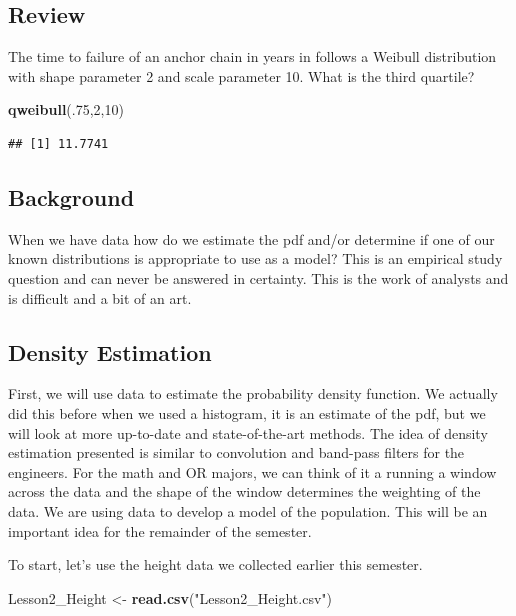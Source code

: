\documentclass[]{book}
\newenvironment{Shaded}{\begin{snugshade}}{\end{snugshade}}
\newcommand{\KeywordTok}[1]{\textcolor[rgb]{0.13,0.29,0.53}{\textbf{#1}}}
\newcommand{\DecValTok}[1]{\textcolor[rgb]{0.00,0.00,0.81}{#1}}
\newcommand{\StringTok}[1]{\textcolor[rgb]{0.31,0.60,0.02}{#1}}
\newcommand{\NormalTok}[1]{#1}
\theoremstyle{definition}
\theoremstyle{definition}
\theoremstyle{definition}
\theoremstyle{remark}
\begin{document}
\subsection{Review}\label{review-3}

The time to failure of an anchor chain in years in follows a Weibull
distribution with shape parameter 2 and scale parameter 10. What is the
third quartile?

\begin{Shaded}
\begin{Highlighting}[]
\KeywordTok{qweibull}\NormalTok{(.}\DecValTok{75}\NormalTok{,}\DecValTok{2}\NormalTok{,}\DecValTok{10}\NormalTok{)}
\end{Highlighting}
\end{Shaded}

\begin{verbatim}
## [1] 11.7741
\end{verbatim}

\subsection{Background}\label{background-1}

When we have data how do we estimate the pdf and/or determine if one of
our known distributions is appropriate to use as a model? This is an
empirical study question and can never be answered in certainty. This is
the work of analysts and is difficult and a bit of an art.

\subsection{Density Estimation}\label{density-estimation}

First, we will use data to estimate the probability density function. We
actually did this before when we used a histogram, it is an estimate of
the pdf, but we will look at more up-to-date and state-of-the-art
methods. The idea of density estimation presented is similar to
convolution and band-pass filters for the engineers. For the math and OR
majors, we can think of it a running a window across the data and the
shape of the window determines the weighting of the data. We are using
data to develop a model of the population. This will be an important
idea for the remainder of the semester.

To start, let's use the height data we collected earlier this semester.

\begin{Shaded}
\begin{Highlighting}[]
\NormalTok{Lesson2_Height <-}\StringTok{ }\KeywordTok{read.csv}\NormalTok{(}\StringTok{"Lesson2_Height.csv"}\NormalTok{)}
\end{Highlighting}
\end{Shaded}
\end{document}
